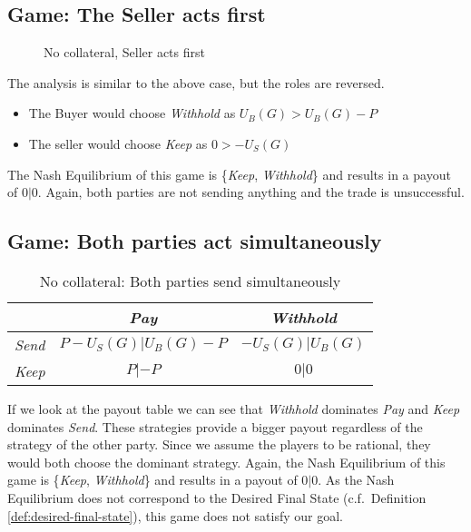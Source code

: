 \documentclass{cacthesis}
\begin{document}
\subsection{Game: The Seller acts first} 

\begin{figure}[htb!]
\centering
\label{fig:nocol-seller-first}
\caption{No collateral, Seller acts first}
\end{figure}


The analysis is similar to the above case, but the roles are reversed. 
\begin{itemize}
    \item The Buyer would choose \emph{Withhold} as $U_B(G) > U_B(G)-P$
    \item The seller would choose \emph{Keep} as $0 > -U_S(G)$
\end{itemize}
The Nash Equilibrium of this game is \{\emph{Keep}, \emph{Withhold}\} and results in a payout of $0|0$. Again, both parties are not sending anything and the trade is unsuccessful.

\subsection{Game: Both parties act simultaneously} 

\begin{table}[htb!]
    \centering
    \begin{tabular}{ c||c|c| }
    & \emph{Pay} & \emph{Withhold}  \\
    \hline
    \hline
    \emph{Send} & $P - U_S(G)|U_B(G) - P$ & $-U_S(G) | U_B(G)$ \\
    \hline
    \emph{Keep} & $P |-P$ & $0 | 0$ \\ 
    \hline
    \end{tabular}
    \label{fig:nocol-simultaneous}
    \caption{No collateral: Both parties send simultaneously}
\end{table}
If we look at the payout table we can see that \emph{Withhold} dominates \emph{Pay} and \emph{Keep} dominates \emph{Send}. These strategies provide a bigger payout regardless of the strategy of the other party.
Since we assume the players to be rational, they would both choose the dominant strategy.
Again, the Nash Equilibrium of this game is \{\emph{Keep}, \emph{Withhold}\} and results in a payout of $0|0$. As the Nash Equilibrium does not correspond to the Desired Final State (c.f.~Definition \ref{def:desired-final-state}), this game does not satisfy our goal.\newline
\end{document}
